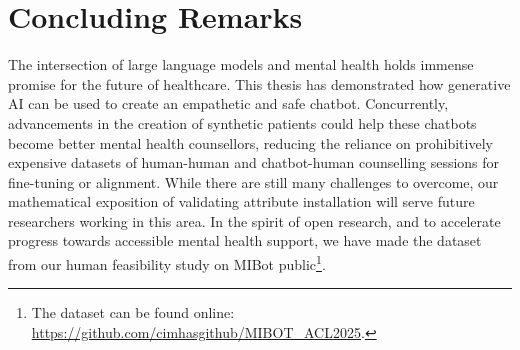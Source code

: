 \section{Concluding Remarks}

The intersection of large language models and mental health holds immense promise for
the future of healthcare. This thesis has demonstrated how generative AI can be used to
create an empathetic and safe chatbot. Concurrently, advancements in the creation of
synthetic patients could help these chatbots become better mental health counsellors,
reducing the reliance on prohibitively expensive datasets of human-human and
chatbot-human counselling sessions for fine-tuning or alignment. While there are still
many challenges to overcome, our mathematical exposition of validating attribute
installation will serve future researchers working in this area. In the spirit of open
research, and to accelerate progress towards accessible mental health support, we have
made the dataset from our human feasibility study on MIBot public\footnote{The dataset
	can be found online: \url{https://github.com/cimhasgithub/MIBOT\_ACL2025}.}.